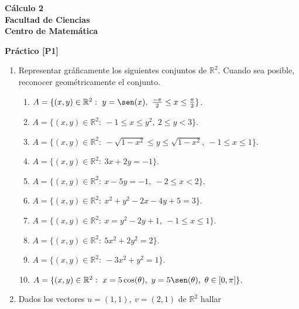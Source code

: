 \documentclass[11pt]{article}
\newcommand{\R}{\mathbb{R}}
\begin{document}
 \hfill {\bf C\'{a}lculo 2} \\
{\bf Facultad de Ciencias}  \\
{\bf Centro de Matem\'{a}tica} 

\vspace{1cm}

\begin{center}
{\bf Pr\'{a}ctico [P1] }
\end{center}

\vspace{0,1cm}

\begin{enumerate}

\item Representar gr\'aficamente los siguientes conjuntos de $\R^2$. Cuando sea posible, reconocer geom\'etricamente el conjunto.

\begin{enumerate}

\item $A=\{(x,y)\in\R^2:\ y=\sen(x),\ \frac{-\pi}{2}\leq x \leq \frac{\pi}{2}\}$.

\item $A=\{(x,y)\in\R^2:\ -1\leq x \leq y^2,\ 2\leq y < 3\}$.

\item $A=\{(x,y)\in\R^2:\ -\sqrt{1-x^2}\leq y \leq \sqrt{1-x^2},\ -1\leq x \leq 1\}$.

\item $A=\{(x,y)\in\R^2:\ 3x+2y=-1\}$.

\item $A=\{(x,y)\in\R^2:\ x-5y=-1,\ -2\leq x < 2\}$.

\item $A=\{(x,y)\in\R^2:\ x^2+y^2-2x-4y+5=3\}$.

\item $A=\{(x,y)\in\R^2:\ x=y^2-2y+1,\ -1\leq x \leq 1\}$.

\item $A=\{(x,y)\in\R^2:\ 5x^2+2y^2=2\}$.

\item $A=\{(x,y)\in\R^2:\ -3x^2+y^2=1\}$.

\item $A=\{(x,y)\in\R^2:\ x=5\cos(\theta),\ y=5\sen(\theta),\ \theta\in[0,\pi]\}$.


\end{enumerate}


\item Dados los vectores $u=(1,1),\ v=(2,1)$ de $\R^2$ hallar


\end{enumerate}
\end{document}
